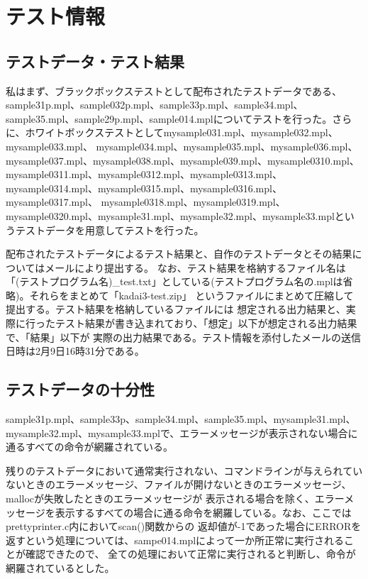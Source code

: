 \documentclass{jarticle}
\begin{document}
\section{テスト情報}
\subsection{テストデータ・テスト結果}
私はまず、ブラックボックステストとして配布されたテストデータである、sample31p.mpl、sample032p.mpl、sample33p.mpl、sample34.mpl、sample35.mpl、sample29p.mpl、sample014.mplについてテストを行った。さらに、ホワイトボックステストとしてmysample031.mpl、mysample032.mpl、mysample033.mpl、
mysample034.mpl、mysample035.mpl、mysample036.mpl、mysample037.mpl、mysample038.mpl、mysample039.mpl、mysample0310.mpl、
mysample0311.mpl、mysample0312.mpl、mysample0313.mpl、mysample0314.mpl、mysample0315.mpl、mysample0316.mpl、mysample0317.mpl、
mysample0318.mpl、mysample0319.mpl、mysample0320.mpl、mysample31.mpl、mysample32.mpl、mysample33.mplというテストデータを用意してテストを行った。

配布されたテストデータによるテスト結果と、自作のテストデータとその結果についてはメールにより提出する。
なお、テスト結果を格納するファイル名は「(テストプログラム名)\_test.txt」としている(テストプログラム名の.mplは省略)。それらをまとめて「kadai3-test.zip」
というファイルにまとめて圧縮して提出する。テスト結果を格納しているファイルには
想定される出力結果と、実際に行ったテスト結果が書き込まれており、「想定」以下が想定される出力結果で、「結果」以下が
実際の出力結果である。テスト情報を添付したメールの送信日時は2月9日16時31分である。

\subsection{テストデータの十分性}
sample31p.mpl、sample33p、sample34.mpl、sample35.mpl、mysample31.mpl、mysample32.mpl、mysample33.mplで、エラーメッセージが表示されない場合に通るすべての命令が網羅されている。

残りのテストデータにおいて通常実行されない、コマンドラインが与えられていないときのエラーメッセージ、ファイルが開けないときのエラーメッセージ、
mallocが失敗したときのエラーメッセージが
表示される場合を除く、エラーメッセージを表示するすべての場合に通る命令を網羅している。なお、ここではprettyprinter.c内においてscan()関数からの
返却値が-1であった場合にERRORを返すという処理については、sampe014.mplによって一か所正常に実行されることが確認できたので、
全ての処理において正常に実行されると判断し、命令が網羅されているとした。
\end{document}
